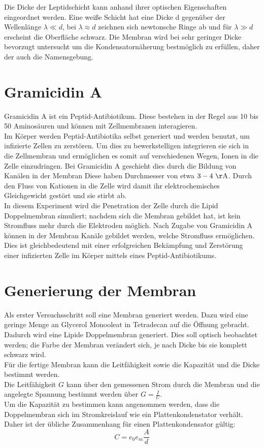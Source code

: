 \documentclass{include/thesisclass3}
\begin{document}
Die Dicke der Leptidschicht kann anhand ihrer optischen Eigenschaften eingeordnet werden. Eine weiße Schicht hat eine Dicke d gegenüber der Wellenlänge $\lambda \ll d$, bei $\lambda \approx d$ zeichnen sich newtonsche Ringe ab und für $\lambda \gg d$ erscheint die Oberfläche schwarz. Die Membran wird bei sehr geringer Dicke bevorzugt untersucht um die Kondensatornäherung bestmöglich zu erfüllen, daher der auch die Namensgebung.

\section{Gramicidin A}
Gramicidin A ist ein Peptid-Antibiotikum. Diese bestehen in der Regel aus 10 bis 50 Aminosäuren und können mit Zellmembranen interagieren.\\
Im Körper werden Peptid-Antibiotika selbst generiert und werden benutzt, um infizierte Zellen zu zerstören.  Um dies zu bewerkstelligen integrieren sie sich in die Zellmembran und ermöglichen es somit auf verschiedenen Wegen, Ionen in die Zelle einzudringen. Bei Gramicidin A geschieht dies durch die Bildung von  Kanälen in der Membran Diese haben Durchmesser von etwa $3 - 4~\si{\AA}$. Durch den Fluss von Kationen in die Zelle wird damit ihr elektrochemisches Gleichgewicht gestört und sie stirbt ab.\\
In diesem Experiment wird die Penetration der Zelle durch die Lipid Doppelmembran simuliert; nachdem sich die Membran gebildet hat, ist kein Stromfluss mehr durch die Elektroden möglich. Nach Zugabe von Gramicidin A können in der Membran Kanäle gebildet werden, welche Stromfluss ermöglichen. Dies ist gleichbedeutend mit einer erfolgreichen Bekämpfung und Zerstörung einer infizierten Zelle im Körper mittels eines Peptid-Antibiotikums.




\section{Generierung der Membran}
Als erster Versuchsschritt soll eine Membran generiert werden. Dazu wird eine geringe Menge an Glycerol Monooleat in Tetradecan auf die Öffnung gebracht. Dadurch wird eine Lipide Doppelmembran generiert. Dies soll optisch beobachtet werden; die Farbe der Membran verändert sich, je nach Dicke bis sie komplett schwarz wird.\\
Für die fertige Membran kann die Leitfähigkeit sowie die Kapazität und die Dicke bestimmt werden. \\Die Leitfähigkeit $G$ kann über den gemessenen Strom durch die Membran und die angelegte Spannung bestimmt werden über $G = \frac{I}{U}$. \\Um die Kapazität zu bestimmen kann angenommen werden, dass die Doppelmembran  sich im Stromkreislauf wie ein Plattenkondenstator verhält. Daher ist der übliche Zusammenhang für einen Plattenkondensator gültig:
\begin{equation}
C = e_0e_m \frac{A}{d}
\end{equation}
\end{document}
